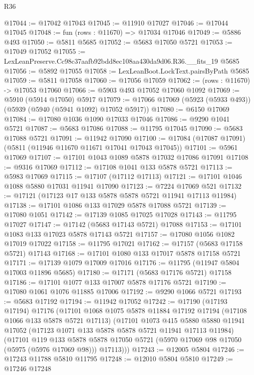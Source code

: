 \begin{lexlean}{R36}
\begin{coremodule}
@17044 := @17042 @17043
@17045 := @11910 @17027
@17046 := @17044 @17045
@17048 := fun (rows : @11670) => @17034 @17046
@17049 := @5886 @493
@17050 := @5811 @5685
@17052 := @5683 @17050 @5721
@17053 := @17049 @17052
@17055 := LexLeanPreserve.Cc98c37aafb92bdd8ec108aa430da9d06.R36.__fits_19 @5685
@17056 := @5892 @17055
@17058 := LexLeanBoot.LockText.pairsByPath @5685
@17059 := @5811 @17058
@17060 := @17056 @17059
@17062 := (rows : @11670) -> @17053 @17060
@17066 := @5903 @493 @17052 @17060 @1092
@17069 := @5910 (@5914 @17050) @5917
@17079 := @17066 @17069 (@5923 (@5933 @493)) (@5939 (@5940 (@5941 @1092) @17052 @5917))
@17080 := @6150 @17069
@17084 := @17080 @1036 @1090 @17033 @17046
@17086 := @9290 @1041 @5721
@17087 := @5683 @17086
@17088 := @11795 @17045
@17090 := @5683 @17088 @5721
@17091 := @11942 @17090
@17100 := @17084 (@17087 @17091) (@5811 (@11946 @11670 @11671 @17041 @17043 @17045))
@17101 := @5961 @17069
@17107 := @17101 @1043 @1089 @5878 @17032 @17086 @17091
@17108 := @9316 @17069
@17112 := @17108 @1041 @133 @5878 @5721
@17113 := @5983 @17069
@17115 := @17107 (@17112 @17113)
@17121 := @17101 @1046 @1088 @5880 @17031 @11941 @17090
@17123 := @7224 @17069 @521
@17132 := @17121 (@17123 @17 @133 @5878 @5878 @5721 @11941 @17113 @11984)
@17138 := @17101 @1086 @133 @17029 @5878 @17088 @5721
@17139 := @17080 @1051
@17142 := @17139 @1085 @17025 @17028
@17143 := @11795 @17027
@17147 := @17142 (@5683 @17143 @5721) @17088
@17153 := @17101 @1083 @133 @17023 @5878 @17143 @5721
@17157 := @17080 @1056 @1082 @17019 @17022
@17158 := @11795 @17021
@17162 := @17157 (@5683 @17158 @5721) @17143
@17168 := @17101 @1080 @133 @17017 @5878 @17158 @5721
@17171 := @17139 @1079 @17009 @17016
@17176 := @11795 (@11947 @5804 @17003 @11896 @5685)
@17180 := @17171 (@5683 @17176 @5721) @17158
@17186 := @17101 @1077 @133 @17007 @5878 @17176 @5721
@17190 := @17080 @1061 @1076 @11885 @17006
@17192 := @9290 @1066 @5721
@17193 := @5683 @17192
@17194 := @11942 @17052
@17242 := @17190
    (@17193 @17194)
    @17176
    (@17101
      @1068
      @1075
      @5878
      @11884
      @17192
      @17194
      (@17108 @1066 @133 @5878 @5721 @17113)
      (@17101
        @1073
        @415
        @5880
        @5880
        @11941
        @17052
        (@17123 @1071 @133 @5878 @5878 @5721 @11941 @17113 @11984)
        (@17101
          @119
          @133
          @5878
          @5878
          @17050
          @5721
          (@5970 @17069 @98 @17050 (@5975 (@5976 @17069 @98)))
          @17113)))
@17243 := @12005 @5804
@17246 := @17243 @11788 @5810 @11795
@17248 := @12010 @5804 @5810
@17249 := @17246 @17248

\end{coremodule}
\end{lexlean}
